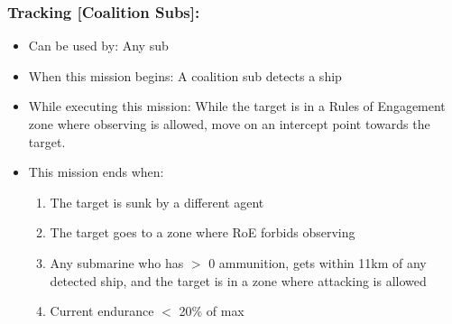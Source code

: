 \documentclass{article}
\begin{document}
    \subsubsection{Tracking [Coalition Subs]:}
        \begin{itemize}
            \item{Can be used by:} Any sub
            \item{When this mission begins:} A coalition sub detects a ship
            \item{While executing this mission:} While the target is in a Rules of Engagement zone where observing is allowed, move on an intercept point towards the target.
            \item{This mission ends when:} 
            \begin{enumerate}[label=\arabic*)]
                \item The target is sunk by a different agent \par
                [escort resumes player-assigned mission]
                \item The target goes to a zone where RoE forbids observing \par
                [escort resumes player-assigned mission]
                \item Any submarine who has $>$ 0 ammunition, gets within 11km of any detected ship, and the target is in a zone where attacking is allowed \par
                [escort begins Attacking Ship - Non-Deckgun
                \item Any submarine who has $>$ 0 ammunition, gets within 11km of any detected sub, and the target is in a zone where attacking is allowed \par
                [escort begins Attacking Submarine]
                \item Current endurance $<$ 20\% of max \par
                [escort returns to base]
            \end{enumerate}
        \end{itemize}
\end{document}

